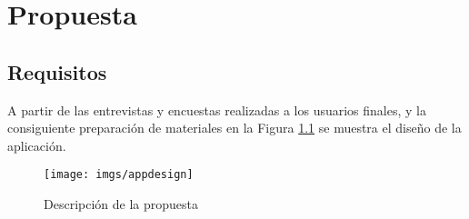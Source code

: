 \chapter{Propuesta}
\section{Requisitos}
A partir de las entrevistas y encuestas realizadas a los usuarios finales, y la consiguiente preparación de materiales en la Figura \ref{fig:app} se muestra el diseño de la aplicación.

\begin{figure}[H]
\centering
\texttt{[image: imgs/appdesign]}
\caption{Descripción de la propuesta}
\label{fig:app}
\end{figure}

